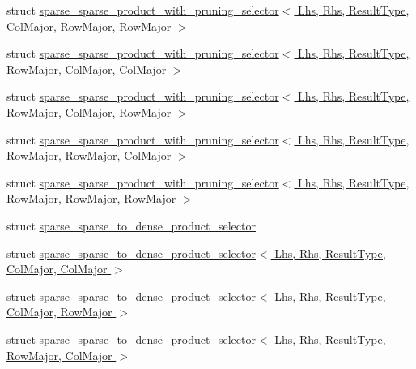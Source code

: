 \begin{DoxyCompactItemize}
\item 
struct \hyperlink{struct_eigen_1_1internal_1_1sparse__sparse__product__with__pruning__selector_3_01_lhs_00_01_rhs_8b2f3809f6470cfe6598a7debb24ca1d}{sparse\+\_\+sparse\+\_\+product\+\_\+with\+\_\+pruning\+\_\+selector$<$ Lhs, Rhs, Result\+Type, Col\+Major, Row\+Major, Row\+Major $>$}
\item 
struct \hyperlink{struct_eigen_1_1internal_1_1sparse__sparse__product__with__pruning__selector_3_01_lhs_00_01_rhs_a29c87f6ec217a6cab39d35f96e8e389}{sparse\+\_\+sparse\+\_\+product\+\_\+with\+\_\+pruning\+\_\+selector$<$ Lhs, Rhs, Result\+Type, Row\+Major, Col\+Major, Col\+Major $>$}
\item 
struct \hyperlink{struct_eigen_1_1internal_1_1sparse__sparse__product__with__pruning__selector_3_01_lhs_00_01_rhs_b0be43d8f2c00d3048196cb82593ae0c}{sparse\+\_\+sparse\+\_\+product\+\_\+with\+\_\+pruning\+\_\+selector$<$ Lhs, Rhs, Result\+Type, Row\+Major, Col\+Major, Row\+Major $>$}
\item 
struct \hyperlink{struct_eigen_1_1internal_1_1sparse__sparse__product__with__pruning__selector_3_01_lhs_00_01_rhs_e175d5ee5e029960308385b07451d28e}{sparse\+\_\+sparse\+\_\+product\+\_\+with\+\_\+pruning\+\_\+selector$<$ Lhs, Rhs, Result\+Type, Row\+Major, Row\+Major, Col\+Major $>$}
\item 
struct \hyperlink{struct_eigen_1_1internal_1_1sparse__sparse__product__with__pruning__selector_3_01_lhs_00_01_rhs_ac6a83f16fa8af56c1b06b928dbc0536}{sparse\+\_\+sparse\+\_\+product\+\_\+with\+\_\+pruning\+\_\+selector$<$ Lhs, Rhs, Result\+Type, Row\+Major, Row\+Major, Row\+Major $>$}
\item 
struct \hyperlink{struct_eigen_1_1internal_1_1sparse__sparse__to__dense__product__selector}{sparse\+\_\+sparse\+\_\+to\+\_\+dense\+\_\+product\+\_\+selector}
\item 
struct \hyperlink{struct_eigen_1_1internal_1_1sparse__sparse__to__dense__product__selector_3_01_lhs_00_01_rhs_00_0b0481ed72407c1b6a48b36ffd79869ef}{sparse\+\_\+sparse\+\_\+to\+\_\+dense\+\_\+product\+\_\+selector$<$ Lhs, Rhs, Result\+Type, Col\+Major, Col\+Major $>$}
\item 
struct \hyperlink{struct_eigen_1_1internal_1_1sparse__sparse__to__dense__product__selector_3_01_lhs_00_01_rhs_00_03ba5c23d41a3f74ec97ddc300014b4ee}{sparse\+\_\+sparse\+\_\+to\+\_\+dense\+\_\+product\+\_\+selector$<$ Lhs, Rhs, Result\+Type, Col\+Major, Row\+Major $>$}
\item 
struct \hyperlink{struct_eigen_1_1internal_1_1sparse__sparse__to__dense__product__selector_3_01_lhs_00_01_rhs_00_08b233438bc6784cbf4bc720db2f0656b}{sparse\+\_\+sparse\+\_\+to\+\_\+dense\+\_\+product\+\_\+selector$<$ Lhs, Rhs, Result\+Type, Row\+Major, Col\+Major $>$}

\end{DoxyCompactItemize}
